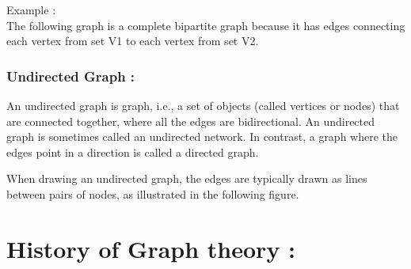 \documentclass[12pt,letterpaper]{report}
\begin{document}
\large Example : \\
The following graph is a complete bipartite graph because it has edges connecting each vertex from set V1 to each vertex from set V2.
\begin{center}
\subsection{{\color{blue}Undirected Graph :}}An undirected graph is graph, i.e., a set of objects (called vertices or nodes) that are connected together, where all the edges are bidirectional. An undirected graph is sometimes called an undirected network. In contrast, a graph where the edges point in a direction is called a directed graph.

When drawing an undirected graph, the edges are typically drawn as lines between pairs of nodes, as illustrated in the following figure.

\end{center}
\newpage
\chapter{\color{blue}{}History of Graph theory :}
\end{document}
